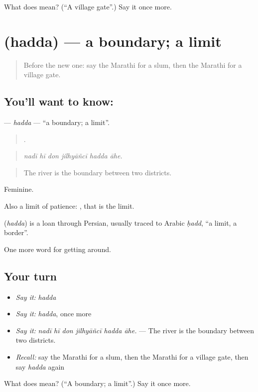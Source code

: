 \begin{tcolorbox}[breakable,colback=teal!4,colframe=teal!35!black,title={Before you move on}]
What does  mean? (\textquotedblleft{}A village gate\textquotedblright{}.) Say it once more.
\end{tcolorbox}
\section[\texorpdfstring{\mr{हद्द} (hadda)}{हद्द (hadda)}]{ (hadda) — a boundary; a limit}

\label{lesson:MR-C421-hadda}



\begin{quote}
Before the new one: say the Marathi for a slum, then the Marathi for a village gate.
\end{quote}

\subsection*{You'll want to know: }
\textbf{} — \emph{hadda} — \textquotedblleft{}a boundary; a limit\textquotedblright{}.

\begin{quote}
     .
\end{quote}

\begin{quote}
\emph{nadī hī don jilhyāñcī hadda āhe.}
\end{quote}

\begin{quote}
The river is the boundary between two districts.
\end{quote}

Feminine.

Also a limit of patience:  , that is the limit.

\begin{cousinweb}
\textbf{} (\emph{hadda}) is a loan through Persian, usually traced to Arabic \emph{ḥadd}, \textquotedblleft{}a limit, a border\textquotedblright{}.
\end{cousinweb}

\begin{grammarlens}[title={What you've built}]
One more word for getting around.
\end{grammarlens}

\subsection*{Your turn}
\begin{itemize}
\raggedright
  \item \emph{Say it:} \emph{hadda}
  \item \emph{Say it:} \emph{hadda}, once more
  \item \emph{Say it:} \emph{nadī hī don jilhyāñcī hadda āhe.} — The river is the boundary between two districts.
  \item \emph{Recall:} say the Marathi for a slum, then the Marathi for a village gate, then say \emph{hadda} again
\end{itemize}

\begin{tcolorbox}[breakable,colback=teal!4,colframe=teal!35!black,title={Before you move on}]
What does  mean? (\textquotedblleft{}A boundary; a limit\textquotedblright{}.) Say it once more.
\end{tcolorbox}

